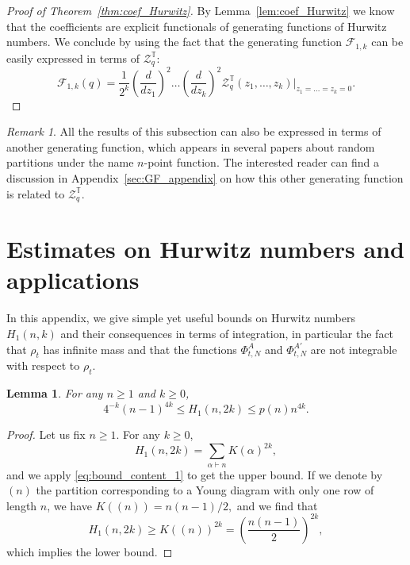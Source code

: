 \documentclass[11pt,a4paper,reqno]{article}
\newtheorem{lemma}[theorem]{Lemma}
\theoremstyle{definition}
\theoremstyle{remark}
\newtheorem{remark}[theorem]{Remark}
\newcommand\Tbb{\mathbb{T}}
\begin{document}
\begin{proof}[Proof of Theorem~\ref{thm:coef_Hurwitz}]
By Lemma~\ref{lem:coef_Hurwitz} we know that the coefficients are explicit functionals of generating functions of Hurwitz numbers. We conclude by using the fact that the generating function $\mathcal{F}_{1,k}$ can be easily expressed in terms of $\mathcal{Z}_q^\Tbb$:
\begin{equation}\label{eq:Hurwitz_GW_gf}
\mathcal{F}_{1,k}(q) = \frac{1}{2^{k}}\left(\frac{d}{dz_1}\right)^2\ldots \left(\frac{d}{dz_{k}}\right)^2\mathcal{Z}_q^\Tbb(z_1,\ldots,z_{k})\vert_{z_1=\ldots=z_{k}=0}.
\end{equation}
\end{proof}

\begin{remark}
All the results of this subsection can also be expressed in terms of another generating function, which appears in several papers about random partitions \cite{BO,EO,Oko} under the name $n$-point function. The interested reader can find a discussion in Appendix~\ref{sec:GF_appendix} on how this other generating function is related to $\mathcal{Z}_q^\Tbb$.
\end{remark}





\appendix

\section{Estimates on Hurwitz numbers and applications}

In this appendix, we give simple yet useful bounds on Hurwitz numbers $H_1(n,k)$ and their consequences in terms of integration, in particular the fact that $\rho_t$ has infinite mass and that the functions $\Phi_{t,N}^A$ and $\Phi_{t,N}^{A'}$ are not integrable with respect to $\rho_t$.


\begin{lemma}\label{prop:bound_Hurwitz}
For any $n\geq 1$ and $k\geq 0$,
\begin{equation}\label{eq:bound_Hurwitz}
4^{-k}(n-1)^{4k}\leq H_1(n,2k)\leq p(n)n^{4k}.
\end{equation}
\end{lemma}

\begin{proof}
Let us fix $n\geq 1$. For any $k\geq 0$,
\[
H_1(n,2k)=\sum_{\alpha\vdash n}K(\alpha)^{2k},
\]
and we apply \eqref{eq:bound_content_1} to get the upper bound. If we denote by $(n)$ the partition corresponding to a Young diagram with only one row of length $n$, we have $K((n))=n(n-1)/2,$ and we find that
\[
H_1(n,2k)\geq K((n))^{2k}=\left(\frac{n(n-1)}{2}\right)^{2k},
\]
which implies the lower bound.
\end{proof}
\end{document}
